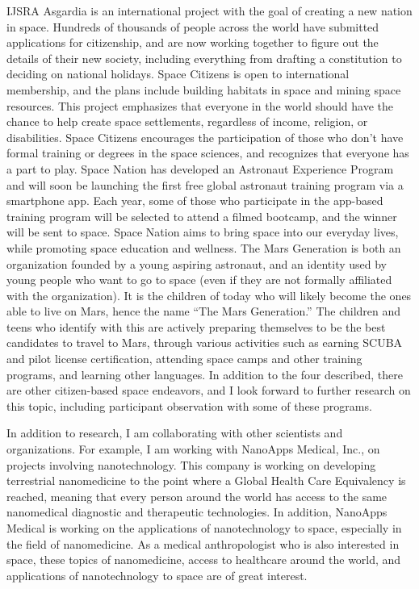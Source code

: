 \begin{labeling}{IJSRA}
	Asgardia is an international project with the goal of creating a new nation in space. Hundreds of thousands of people across the world have submitted applications for citizenship, and are now working together to figure out the details of their new society, including everything from drafting a constitution to deciding on national holidays. Space Citizens is open to international membership, and the plans include building habitats in space and mining space resources. This project emphasizes that everyone in the world should have the chance to help create space settlements, regardless of income, religion, or disabilities. Space Citizens encourages the participation of those who don’t have formal training or degrees in the space sciences, and recognizes that everyone has a part to play. Space Nation has developed an Astronaut Experience Program and will soon be launching the first free global astronaut training program via a smartphone app. Each year, some of those who participate in the app-based training program will be selected to attend a filmed bootcamp, and the winner will be sent to space. Space Nation aims to bring space into our everyday lives, while promoting space education and wellness. The Mars Generation is both an organization founded by a young aspiring astronaut, and an identity used by young people who want to go to space (even if they are not formally affiliated with the organization). It is the children of today who will likely become the ones able to live on Mars, hence the name “The Mars Generation.” The children and teens who identify with this are actively preparing themselves to be the best candidates to travel to Mars, through various activities such as earning SCUBA and pilot license certification, attending space camps and other training programs, and learning other languages. In addition to the four described, there are other citizen-based space endeavors, and I look forward to further research on this topic, including participant observation with some of these programs.

	In addition to research, I am collaborating with other scientists and organizations. For example, I am working with NanoApps Medical, Inc., on projects involving nanotechnology. This company is working on developing terrestrial nanomedicine to the point where a Global Health Care Equivalency is reached, meaning that every person around the world has access to the same nanomedical diagnostic and therapeutic technologies. In addition, NanoApps Medical is working on the applications of nanotechnology to space, especially in the field of nanomedicine. As a medical anthropologist who is also interested in space, these topics of nanomedicine, access to healthcare around the world, and applications of nanotechnology to space are of great interest.


\end{labeling}
